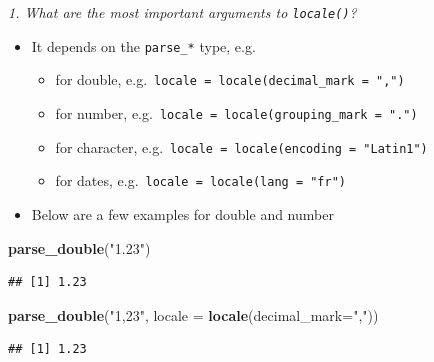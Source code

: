 \documentclass[]{book}
\newenvironment{Shaded}{\begin{snugshade}}{\end{snugshade}}
\newcommand{\CommentTok}[1]{\textcolor[rgb]{0.56,0.35,0.01}{\textit{#1}}}
\newcommand{\DataTypeTok}[1]{\textcolor[rgb]{0.13,0.29,0.53}{#1}}
\newcommand{\KeywordTok}[1]{\textcolor[rgb]{0.13,0.29,0.53}{\textbf{#1}}}
\newcommand{\NormalTok}[1]{#1}
\newcommand{\StringTok}[1]{\textcolor[rgb]{0.31,0.60,0.02}{#1}}
\providecommand{\tightlist}{%
  \setlength{\itemsep}{0pt}\setlength{\parskip}{0pt}}
\theoremstyle{definition}
\theoremstyle{definition}
\theoremstyle{definition}
\theoremstyle{remark}
\begin{document}
\emph{1. What are the most important arguments to \texttt{locale()}?}

\begin{itemize}
\tightlist
\item
  It depends on the \texttt{parse\_*} type, e.g.~

  \begin{itemize}
  \tightlist
  \item
    for double, e.g.~\texttt{locale\ =\ locale(decimal\_mark\ =\ ",")}
  \item
    for number, e.g.~\texttt{locale\ =\ locale(grouping\_mark\ =\ ".")}
  \item
    for character,
    e.g.~\texttt{locale\ =\ locale(encoding\ =\ "Latin1")}
  \item
    for dates, e.g.~\texttt{locale\ =\ locale(lang\ =\ "fr")}
  \end{itemize}
\item
  Below are a few examples for double and number
\end{itemize}

\begin{Shaded}
\begin{Highlighting}[]
\KeywordTok{parse_double}\NormalTok{(}\StringTok{"1.23"}\NormalTok{)}
\end{Highlighting}
\end{Shaded}

\begin{verbatim}
## [1] 1.23
\end{verbatim}

\begin{Shaded}
\begin{Highlighting}[]
\KeywordTok{parse_double}\NormalTok{(}\StringTok{"1,23"}\NormalTok{, }\DataTypeTok{locale =} \KeywordTok{locale}\NormalTok{(}\DataTypeTok{decimal_mark=}\StringTok{","}\NormalTok{))}
\end{Highlighting}
\end{Shaded}

\begin{verbatim}
## [1] 1.23
\end{verbatim}

\begin{Shaded}
\end{Shaded}
\end{document}
